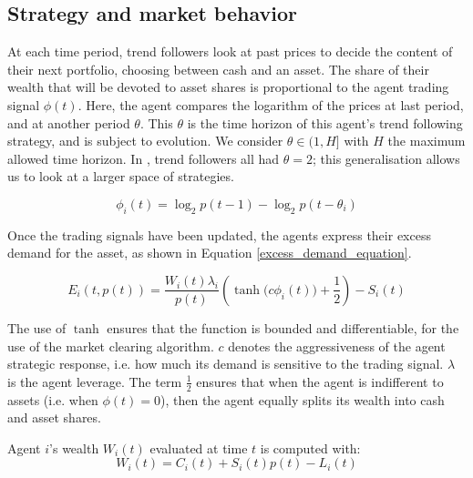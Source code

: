 \documentclass{article}
\begin{document}
\subsection{Strategy and market behavior}
At each time period, trend followers look at past prices to decide the content of their next portfolio, choosing between cash and an asset. The share of their wealth that will be devoted to asset shares is proportional to the agent trading signal $\phi(t)$. Here, the agent compares the logarithm of the prices at last period, and at another period $\theta$. This $\theta$ is the time horizon of this agent's trend following strategy, and is subject to evolution. We consider $\theta \in (1, H]$ with $H$ the maximum allowed time horizon. In \cite{scholl2020market}, trend followers all had $\theta = 2$; this generalisation allows us to look at a larger space of strategies.

\begin{equation}
    \label{trend_following_equation}
    \phi_i(t) = \log_2 p(t-1) - \log_2 p(t-\theta_i)
\end{equation}

Once the trading signals have been updated, the agents express their excess demand for the asset, as shown in Equation \ref{excess_demand_equation}. 

\begin{equation}
\label{excess_demand_equation}
   E_i(t, p(t)) = \frac{W_i(t) {\lambda_i}}{p(t)} \left( \tanh{({c} \phi_i(t)}) + \frac{1}{2} \right) - S_i(t)
\end{equation}

The use of $\tanh$ ensures that the function is bounded and differentiable, for the use of the market clearing algorithm. $c$ denotes the aggressiveness of the agent strategic response, i.e. how much its demand is sensitive to the trading signal. $\lambda$ is the agent leverage. The term $\frac{1}{2}$ ensures that when the agent is indifferent to assets (i.e. when $\phi(t) = 0$), then the agent equally splits its wealth into cash and asset shares.

Agent $i$'s wealth $W_i(t)$ evaluated at time $t$ is computed with:
\begin{equation}
    W_i(t) = C_i(t) + S_i(t)p(t) - L_i(t)
\end{equation}
 
\end{document}
